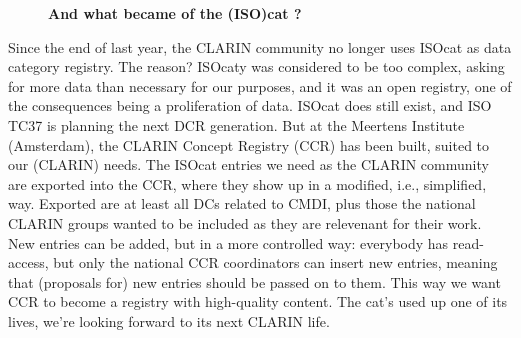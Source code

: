 \documentclass[10pt, a4paper, twopage, headinclude, footinclude, BCOR5mm]{book}
\begin{document}
\newpage

\begin{figure}[t!]
\centering
\large\textbf{And what became of the (ISO)cat ?}
\vspace*{0.5cm}
\end{figure}


\begin{table}[t!]
\end{table} 
\noindent
Since the end of last year, the CLARIN community no longer uses ISOcat as data category registry. The reason? ISOcaty was considered to be too complex, asking for more data than necessary for our purposes, and it was an open registry, one of the consequences being a proliferation of data.  ISOcat does still exist, and ISO TC37 is planning the next DCR generation. But at the Meertens Institute (Amsterdam), the CLARIN Concept Registry (CCR) has been built, suited to our (CLARIN) needs.  The ISOcat entries we need as the CLARIN community are exported into the  CCR, where they show up in a modified, i.e., simplified, way. Exported are at least all DCs related to CMDI, plus those the national CLARIN groups wanted to be included as they are relevenant for their work. New entries can be added, but in a more controlled way: everybody has read-access, but only the national CCR coordinators can  insert new entries, meaning that (proposals for) new entries should be passed on to them. This way we want CCR to become a registry with high-quality content.   The cat's used up one of its lives, we're looking forward to its next CLARIN life.  
\end{document}
